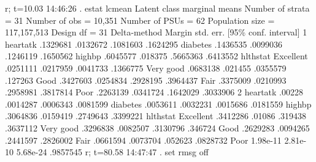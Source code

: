 r; t=10.03 14:46:26
{\smallskip}
. estat lcmean
{\smallskip}
Latent class marginal means
{\smallskip}
Number of strata = 31                            Number of obs   =      10,351
Number of PSUs   = 62                            Population size = 117,157,513
                                                 Design df       =          31
{\smallskip}
             {\VBAR}            Delta-method
             {\VBAR}     Margin   std. err.     [95\% conf. interval]
1            {\VBAR}
    heartatk {\VBAR}   .1329681   .0132672      .1081603    .1624295
    diabetes {\VBAR}   .1436535   .0099036      .1246119    .1650562
      highbp {\VBAR}   .6045577    .018375      .5665363    .6413552
             {\VBAR}
    hlthstat {\VBAR}
  Excellent  {\VBAR}   .0251111   .0217959      .0041733    .1366775
  Very good  {\VBAR}   .0683138    .021455      .0355579     .127263
       Good  {\VBAR}   .3427603   .0254834      .2928195    .3964437
       Fair  {\VBAR}   .3375009   .0210993      .2958981    .3817814
       Poor  {\VBAR}   .2263139   .0341724      .1642029    .3033906
2            {\VBAR}
    heartatk {\VBAR}     .00228   .0014287      .0006343    .0081599
    diabetes {\VBAR}   .0053611   .0032231      .0015686    .0181559
      highbp {\VBAR}   .3064836   .0159419      .2749643    .3399221
             {\VBAR}
    hlthstat {\VBAR}
  Excellent  {\VBAR}   .3412286     .01086       .319438    .3637112
  Very good  {\VBAR}   .3296838   .0082507      .3130796     .346724
       Good  {\VBAR}   .2629283   .0094265      .2441597    .2826002
       Fair  {\VBAR}   .0661594   .0073704       .052623    .0828732
       Poor  {\VBAR}   1.98e-11   2.81e-10      5.68e-24    .9857545
r; t=80.58 14:47:47
{\smallskip}
. set rmsg off    
{\smallskip}
